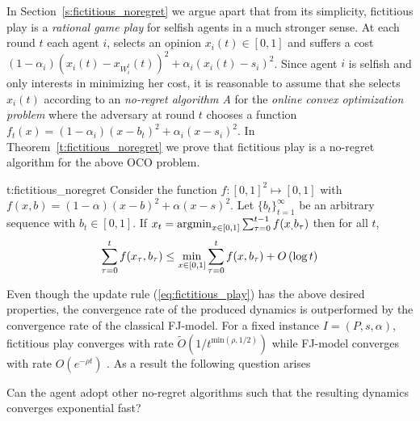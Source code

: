In Section~\ref{s:fictitious_noregret} we argue apart that from its simplicity,
fictitious play is a \emph{rational game play} for selfish agents in a much
stronger sense. At each round $t$ each agent $i$,
selects an opinion $x_i(t) \in [0,1]$
and suffers a cost $(1-\alpha_i)(x_i(t)-x_{W_i^t}(t))^2 + \alpha_i(x_i(t)-s_i)^2$.
Since agent $i$ is selfish and only interests in minimizing her cost, it is reasonable to assume
that she selects $x_i(t)$ according to an \emph{no-regret algorithm A}
for the \emph{online convex optimization problem} where the adversary at round $t$ chooses
a function $f_t(x)=(1-\alpha_i)(x-b_t)^2 + \alpha_i(x-s_i)^2$.
In Theorem~\ref{t:fictitious_noregret} we prove that fictitious play is a
no-regret algorithm for the above OCO problem.

\begin{reptheorem}{t:fictitious_noregret}
  Consider the function $f:[0,1]^2 \mapsto [0,1]$ with
  $f(x,b) = (1-\alpha)(x-b)^2 + \alpha(x-s)^2$.
  Let $\{b_t\}_{t=1}^\infty$ be an arbitrary sequence with
  $b_t \in [0,1]$. If $x_t = \operatorname*{argmin}_{x \in [0,1]}\sum_{\tau=0}^{t-1}f(x_,b_\tau)$
  then for all $t$,
  \[
    \sum_{\tau=0}^{t}f(x_\tau,b_\tau) \leq
    \min_{x \in [0,1]}\sum_{\tau=0}^tf(x,b_\tau) + O\left(\log t\right)
  \]
\end{reptheorem}

Even though the update rule (\ref{eq:fictitious_play}) has the above
desired properties, the convergence rate of the produced dynamics is
outperformed by the convergence rate of the classical FJ-model. For
a fixed instance $I=(P,s,\alpha)$, fictitious play converges with rate
$\widetilde{O}(1/t^{\text{min}(\rho,1/2)})$ while FJ-model
converges with rate $O(e^{-\rho t})$ \cite{GS14}.
As a result the following question arises
\begin{question}
  Can the agent adopt other no-regret algorithms such that the resulting
  dynamics converges exponential fast?
\end{question}

